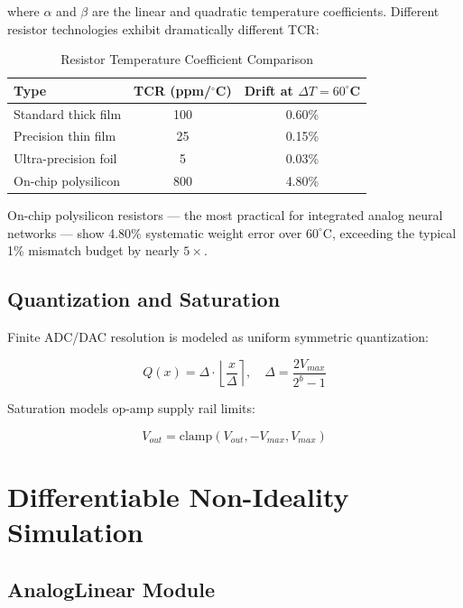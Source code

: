 \documentclass[10pt,twocolumn]{article}
\begin{document}
where $\alpha$ and $\beta$ are the linear and quadratic temperature coefficients. Different resistor technologies exhibit dramatically different TCR:

\begin{table}[t]
  \centering
  \caption{Resistor Temperature Coefficient Comparison}
  \label{tab:tcr}
  \begin{tabular}{lcc}
    \toprule
    Type & TCR (ppm/$^\circ$C) & Drift at $\Delta T = 60^\circ$C \\
    \midrule
    Standard thick film & 100 & 0.60\% \\
    Precision thin film & 25 & 0.15\% \\
    Ultra-precision foil & 5 & 0.03\% \\
    On-chip polysilicon & 800 & 4.80\% \\
    \bottomrule
  \end{tabular}
\end{table}

On-chip polysilicon resistors --- the most practical for integrated analog neural networks --- show 4.80\% systematic weight error over $60^\circ$C, exceeding the typical 1\% mismatch budget by nearly $5\times$.

\subsection{Quantization and Saturation}

Finite ADC/DAC resolution is modeled as uniform symmetric quantization:

\begin{equation}
Q(x) = \Delta \cdot \left\lfloor \frac{x}{\Delta} \right\rceil, \quad \Delta = \frac{2V_{max}}{2^b - 1}
\end{equation}

Saturation models op-amp supply rail limits:

\begin{equation}
V_{out} = \text{clamp}(V_{out}, -V_{max}, V_{max})
\end{equation}

\section{Differentiable Non-Ideality Simulation}

\subsection{AnalogLinear Module}
\end{document}
